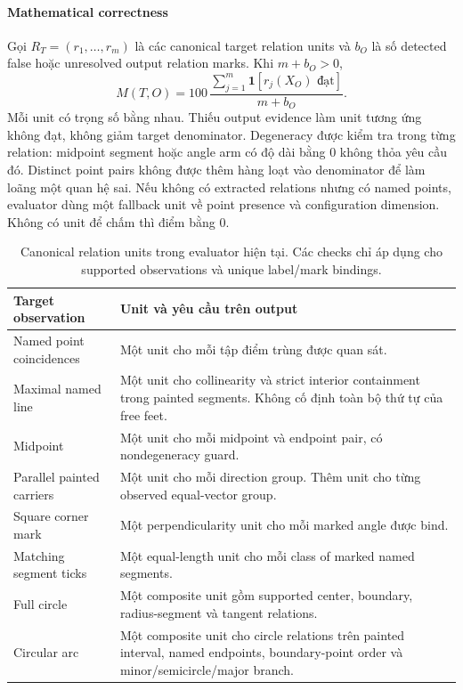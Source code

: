 \documentclass[a4paper,12pt]{article}
\begin{document}
\paragraph{Mathematical correctness}
Gọi $R_T=(r_1,\ldots,r_m)$ là các canonical target relation units và $b_O$ là số detected false hoặc unresolved output relation marks. Khi $m+b_O>0$,
\begin{equation}
M(T,O)=100\,
\frac{\sum_{j=1}^{m}\mathbf 1[r_j(X_O)\text{ đạt}]}
{m+b_O}.
\end{equation}
Mỗi unit có trọng số bằng nhau. Thiếu output evidence làm unit tương ứng không đạt, không giảm target denominator. Degeneracy được kiểm tra trong từng relation: midpoint segment hoặc angle arm có độ dài bằng 0 không thỏa yêu cầu đó. Distinct point pairs không được thêm hàng loạt vào denominator để làm loãng một quan hệ sai. Nếu không có extracted relations nhưng có named points, evaluator dùng một fallback unit về point presence và configuration dimension. Không có unit để chấm thì điểm bằng 0.

\begin{table}[tbp]
\centering\small
\caption{Canonical relation units trong evaluator hiện tại. Các checks chỉ áp dụng cho supported observations và unique label/mark bindings.}
\label{tab:relations}
\renewcommand{\arraystretch}{1.15}
\begin{tabularx}{\linewidth}{@{}>{\raggedright\arraybackslash}p{.30\linewidth} >{\raggedright\arraybackslash}X@{}}
\toprule
\textbf{Target observation} & \textbf{Unit và yêu cầu trên output} \\
\midrule
Named point coincidences & Một unit cho mỗi tập điểm trùng được quan sát. \\
Maximal named line & Một unit cho collinearity và strict interior containment trong painted segments. Không cố định toàn bộ thứ tự của free feet. \\
Midpoint & Một unit cho mỗi midpoint và endpoint pair, có nondegeneracy guard. \\
Parallel painted carriers & Một unit cho mỗi direction group. Thêm unit cho từng observed equal-vector group. \\
Square corner mark & Một perpendicularity unit cho mỗi marked angle được bind. \\
Matching segment ticks & Một equal-length unit cho mỗi class of marked named segments. \\
Full circle & Một composite unit gồm supported center, boundary, radius-segment và tangent relations. \\
Circular arc & Một composite unit cho circle relations trên painted interval, named endpoints, boundary-point order và minor/semicircle/major branch. \\
\bottomrule
\end{tabularx}
\end{table}
\end{document}

